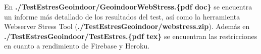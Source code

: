 

En \textbf{./TestEstresGeoindoor/GeoindoorWebStress.\{pdf doc\}} se encuentra un informe más detallado de los resultados del test, así como la herramienta Webserver Stress Tool (\textbf{./TestEstresGeoindoor/webstress.zip}). Además en \textbf{./TestEstresGeoindoor/TestEstres.\{pdf tex\}} se encuentran las restricciones en cuanto a rendimiento de Firebase y Heroku.







